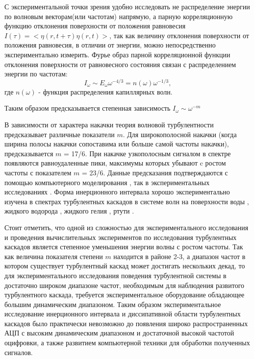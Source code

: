 С экспериментальной точки зрения удобно исследовать не распределение энергии по волновым векторам(или частотам) напрямую, а парную корреляционную функцию отклонения поверхности от положения равновесия $I(\tau)=<\eta(r, t+\tau)\eta(r,t)>$, так как величину отклонения поверхности от положения равновесия, в отличии от энергии, можно непосредственно экспериментально измерить. Фурье образ парной корреляционной функции отклонения поверхности от равновесного состояния связан с распределением энергии по частотам:
\begin{equation}
\label{eq:EOmegaI}
I_\omega \sim E_\omega \omega^{-4/3} = n(\omega) \omega^{-1/3},
\end{equation}
где $n(\omega)$ - функция распределения капиллярных волн.

Таким образом предсказывается степенная зависимость $I_\omega \sim \omega^{-m}$

В зависимости от характера накачки теория волновой турбулентности предсказывает различные показатели $m$. Для широкополосной накачки (когда ширина полосы накачки сопоставима или больше самой частоты накачки), предсказывается $m$ = 17/6. При накачке узкополосным сигналом в спектре появляются равноудаленные пики, максимумы которых убывают c ростом частоты с показателем $m$ = 23/6. Данные предсказания подтверждаются с помощью компьютерного моделирования \cite{Babiano1995, Babiano1987, Falcovich1988, Pushkarev1996}, так в экспериментальных исследованиях \cite{Brazhnikov_liq_hydr, Falcon2007}. Форма инерционного интервала хорошо экспериментально изучена в спектрах турбулентных каскадов в системе волн на поверхности воды \cite{BrazhnikovWater}, жидкого водорода \cite{Brazhnikov2001}, жидкого гелия \cite{Abdurakhimov2007}, ртути \cite{Falcon2007}.

Стоит отметить, что одной из сложностью для экспериментального исследования и проведения вычислительных экспериментов по исследования турбулентных каскадов является степенное уменьшения энергии волны с ростом частоты. Так как величина показателя степени $m$ находится в районе 2-3, а диапазон частот в котором существует турбулентный каскад может достигать нескольких декад, то для экспериментального исследования поведения турбулентной системы в достаточно широком диапазоне частот, необходимым для наблюдения развитого турбулентного каскада, требуется экспериментальное оборудование обладающее большим динамическим диапазоном. Таким образом экспериментальное исследование инерционного интервала и диссипативной области турбулентных каскадов было практически невозможно до появления широко распространенных АЦП с высоким динамическим диапазоном и достаточной высокой частотой оцифровки, а также развитием компьютерной техники для обработки полученных сигналов.

